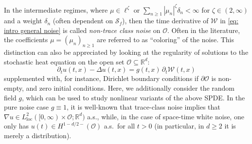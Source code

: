 \documentclass[reqno]{amsart}
\theoremstyle{plain}
\theoremstyle{remark}
\theoremstyle{plain}
\numberwithin{equation}{section}
\newcommand\cO{\mathcal{O}}
\newcommand\cW{\mathcal{W}}
\def\R{{\mathbb R}}
\newcommand{\Domm}{\mathcal{O}}
\newcommand{\loc}{\mathrm{loc}}
\newcommand{\1}{\one}
\newcommand{\Sf}{\mathcal{S}_{f}}
\begin{document}
In the intermediate regimes, where $\mu\in \ell^\zeta$ or $\sum_{n\geq 1}|\mu_n|^\zeta \delta_n<\infty$ for $\zeta\in (2,\infty)$ and a weight $\delta_n$ (often dependent on $\Sf$), then the time derivative of $\cW$ in \eqref{eq: intro general noise} is called \textit{non-trace class noise} on $\cO$. Often in the literature, the coefficients $\mu=(\mu_n)_{n\geq 1}$ are referred to as ``coloring'' of the noise.
%
This distinction can also be appreciated by looking at the regularity of solutions to the stochastic
heat equation on the open set $\Domm\subseteq \R^d$:
\begin{equation}
\label{eq:SHE_intro}
\partial_t u(t,x)-\Delta u(t,x) =g (t,x)\, \partial_t\cW(t,x)
\end{equation}
supplemented with, for instance, Dirichlet boundary conditions if $\partial\Domm$ is non-empty, and zero initial conditions. 
Here, we additionally consider the random field $g$, which can be used to study nonlinear variants of the above SPDE. 
%
In the pure noise case $g\equiv 1$, it is well-known that trace-class noise implies that $\nabla u\in L^2_{\loc}([0,\infty)\times \Domm;\R^d)$ a.s., while, in the case of space-time white noise, one only has $u(t)\in H^{1-d/2-}(\Domm)$ a.s.\ for all $t>0$ (in particular, in $d\geq 2$ it is merely a distribution).

\smallskip
\end{document}
